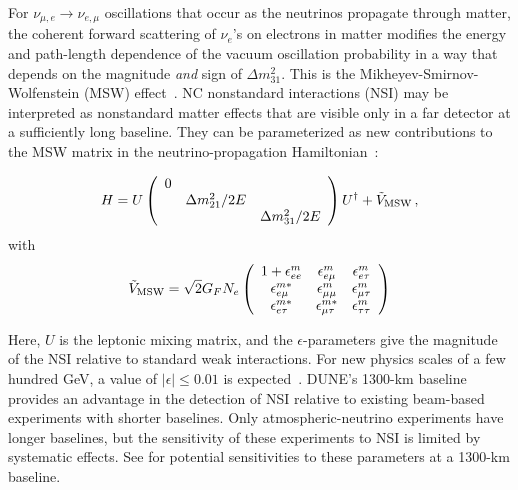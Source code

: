For $\nu_{\mu,e} \rightarrow \nu_{e,\mu}$ 
oscillations that occur as the neutrinos propagate through matter,  
the coherent forward scattering of $\nu_e$'s on electrons in matter 
modifies the energy and path-length dependence of the vacuum oscillation 
probability in a way that depends on the magnitude \emph{and} sign of $\Delta m^2_{31}$. 
This is  the Mikheyev-Smirnov-Wolfenstein (MSW) effect~\cite{Mikheev:1986gs,Wolfenstein:1977ue}.
NC nonstandard interactions (NSI) may be interpreted as nonstandard
matter effects that are visible only in a far detector at a
sufficiently long baseline. 
They can be parameterized as new contributions
to the MSW matrix in the neutrino-propagation Hamiltonian~\cite{Valle:1987gv,Roulet:1991sm}:

\begin{equation}
  H = U \left( \begin{array}{ccc}
           0 &                    & \\
             & \Delta m_{21}^2/2E & \\
             &                    & \Delta m_{31}^2/2E
         \end{array} \right) U^\dag + \tilde{V}_{\rm MSW} \,,
\end{equation}
with
\begin{equation}
  \tilde{V}_{\rm MSW} = \sqrt{2} G_F N_e
\left(
  \begin{array}{ccc}
    1 + \epsilon^m_{ee}       & \epsilon^m_{e\mu}       & \epsilon^m_{e\tau}  \\
        \epsilon^{m*}_{e\mu}  & \epsilon^m_{\mu\mu}     & \epsilon^m_{\mu\tau} \\
        \epsilon^{m*}_{e\tau} & \epsilon^{m*}_{\mu\tau} & \epsilon^m_{\tau\tau}
  \end{array} 
\right)
\end{equation}

Here, $U$ is the leptonic mixing matrix, and the $\epsilon$-parameters give the
magnitude of the NSI relative to standard weak interactions.  For new physics
scales of a few hundred GeV,  a value of $|\epsilon| \leq 0.01$ is
expected~\cite{Davidson:2003ha,GonzalezGarcia:2007ib,Biggio:2009nt,Barranco:2007ej,Escrihuela:2011cf}.
DUNE's 1300-km baseline provides an advantage in the detection of NSI relative
to existing beam-based experiments with shorter baselines.
Only atmospheric-neutrino experiments have longer baselines, but the sensitivity
of these experiments to NSI is limited by systematic effects. See \cite{Adams:2013qkq}
for potential sensitivities to these parameters at a 1300-km baseline.

